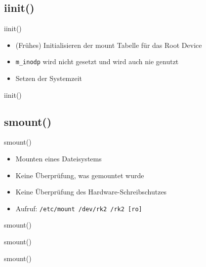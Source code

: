 \documentclass{beamer}
\begin{document}
\subsection{iinit()}

\begin{frame}{iinit()}
    \begin{itemize}
        \item (Frühes) Initialisieren der mount Tabelle für das Root Device
        \item \texttt{m\_inodp} wird nicht gesetzt und wird auch nie genutzt
        \item Setzen der Systemzeit
    \end{itemize}
\end{frame}

\begin{frame}{iinit()}
\end{frame}




\subsection{smount()}

\begin{frame}{smount()}
    \begin{itemize}
        \item Mounten eines Dateisystems
        \item Keine Überprüfung, was gemountet wurde
        \item Keine Überprüfung des Hardware-Schreibschutzes
        \medskip
        \item Aufruf: \texttt{/etc/mount /dev/rk2 /rk2 [ro]}
    \end{itemize}
\end{frame}
\begin{frame}{smount()}
\end{frame}

\begin{frame}{smount()}
\end{frame}

\begin{frame}{smount()}
\end{frame}
\end{document}

